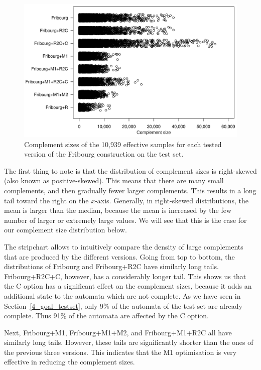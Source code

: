 \begin{figure}[ht]
\centering
\includegraphics[scale=0.575]{../results/figures/internal/goal/s.stripchart.pdf}
\caption{Complement sizes of the 10,939 effective samples for each tested version of the Fribourg construction on the \goal{} test set.}
\label{i.g.stripchart}
\end{figure}

The first thing to note is that the distribution of complement sizes is right-skewed (also known as positive-skewed). This means that there are many small complements, and then gradually fewer larger complements. This results in a long tail toward the right  on the $x$-axis. Generally, in right-skewed distributions, the mean is larger than the median, because the mean is increased by the few number of larger or extremely large values. We will see that this is the case for our complement size distribution below.

The stripchart allows to intuitively compare the density of large complements that are produced by the different versions. Going from top to bottom, the distributions of Fribourg and Fribourg+R2C have similarly long tails. Fribourg+R2C+C, however, has a considerably longer tail. This shows us that the C option has a significant effect on the complement sizes, because it adds an additional state to the automata which are not complete. As we have seen in Section~\ref{4_goal_testset}, only 9\% of the automata of the \goal{} test set are already complete. Thus 91\% of the automata are affected by the C option.

Next, Fribourg+M1, Fribourg+M1+M2, and Fribourg+M1+R2C all have similarly long tails. However, these tails are significantly shorter than the ones of the previous three versions. This indicates that the M1 optimisation is very effective in reducing the complement sizes.

